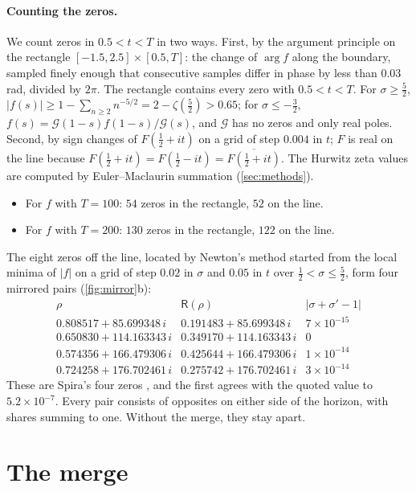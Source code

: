 \documentclass[11pt]{article}
\theoremstyle{definition}\newtheorem{definition}[theorem]{Definition}
\theoremstyle{remark}\newtheorem{remark}[theorem]{Remark}
\begin{document}
\paragraph{Counting the zeros.} We count zeros in $0.5<t<T$ in two ways. First, by the argument principle on the rectangle $[-1.5,2.5]\times[0.5,T]$: the change of $\arg f$ along the boundary, sampled finely enough that consecutive samples differ in phase by less than $0.03$\,rad, divided by $2\pi$. The rectangle contains every zero with $0.5<t<T$. For $\sigma\ge\frac52$, $|f(s)|\ge1-\sum_{n\ge2}n^{-5/2}=2-\zeta(\tfrac52)>0.65$; for $\sigma\le-\frac32$, $f(s)=\mathcal G(1-s)f(1-s)/\mathcal G(s)$, and $\mathcal G$ has no zeros and only real poles. Second, by sign changes of $F(\tfrac12+it)$ on a grid of step $0.004$ in $t$; $F$ is real on the line because $F(\tfrac12+it)=F(\tfrac12-it)=\overline{F(\tfrac12+it)}$. The Hurwitz zeta values are computed by Euler--Maclaurin summation (\cref{sec:methods}).
\begin{itemize}
\item For $f$ with $T=100$: $54$ zeros in the rectangle, $52$ on the line.
\item For $f$ with $T=200$: $130$ zeros in the rectangle, $122$ on the line.
\end{itemize}
The eight zeros off the line, located by Newton's method started from the local minima of $|f|$ on a grid of step $0.02$ in $\sigma$ and $0.05$ in $t$ over $\frac12<\sigma\le\frac52$, form four mirrored pairs (\cref{fig:mirror}b):
\[
\begin{array}{ccc}
\rho & \mathsf R(\rho) & |\sigma+\sigma' -1| \\\hline
0.808517+85.699348\,i & 0.191483+85.699348\,i & 7\times10^{-15}\\
0.650830+114.163343\,i & 0.349170+114.163343\,i & 0\\
0.574356+166.479306\,i & 0.425644+166.479306\,i & 1\times10^{-14}\\
0.724258+176.702461\,i & 0.275742+176.702461\,i & 3\times10^{-14}
\end{array}
\]
These are Spira's four zeros \cite{Spira}, and the first agrees with the quoted value to $5.2\times10^{-7}$. Every pair consists of opposites on either side of the horizon, with shares summing to one. Without the merge, they stay apart.

\section{The merge}\label{sec:merge}
\end{document}
